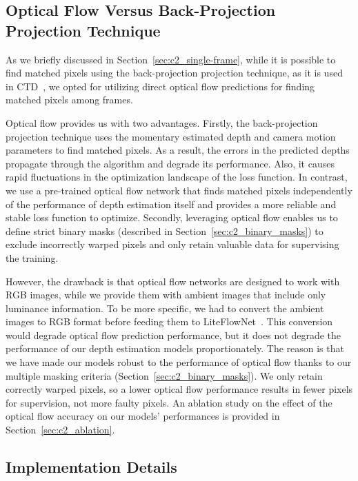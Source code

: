 \subsection{Optical Flow Versus Back-Projection Projection Technique} \label{sec:c2_liteflownet}
As we briefly discussed in Section~\ref{sec:c2_single-frame}, while it is possible to find matched pixels using the back-projection projection technique, as it is used in CTD~\citep{riegler2019connecting}, we opted for utilizing direct optical flow predictions for finding matched pixels among frames.

Optical flow provides us with two advantages. Firstly, the back-projection projection technique uses the momentary estimated depth and camera motion parameters to find matched pixels. As a result, the errors in the predicted depths propagate through the algorithm and degrade its performance. Also, it causes rapid fluctuations in the optimization landscape of the loss function. In contrast, we use a pre-trained optical flow network that finds matched pixels independently of the performance of depth estimation itself and provides a more reliable and stable loss function to optimize. Secondly, leveraging optical flow enables us to define strict binary masks (described in Section~\ref{sec:c2_binary_masks}) to exclude incorrectly warped pixels and only retain valuable data for supervising the training.

However, the drawback is that optical flow networks are designed to work with RGB images, while we provide them with ambient images that include only luminance information. To be more specific, we had to convert the ambient images to RGB format before feeding them to LiteFlowNet~\citep{hui2018liteflownet}. This conversion would degrade optical flow prediction performance, but it does not degrade the performance of our depth estimation models proportionately. The reason is that we have made our models robust to the performance of optical flow thanks to our multiple masking criteria (Section~\ref{sec:c2_binary_masks}). We only retain correctly warped pixels, so a lower optical flow performance results in fewer pixels for supervision, not more faulty pixels. An ablation study on the effect of the optical flow accuracy on our models' performances is provided in Section~\ref{sec:c2_ablation}.

\subsection{Implementation Details} \label{sec:c2_implementation}

